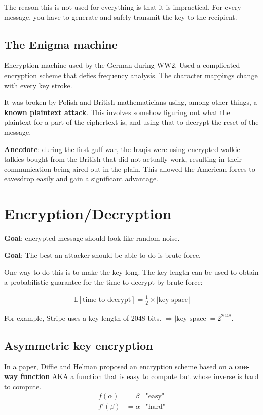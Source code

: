 \documentclass[twoside]{article}
\begin{document}
The reason this is not used for everything is that it is impractical. For every message, you have to generate and safely transmit the key to the recipient.

\subsection{The Enigma machine}
Encryption machine used by the German during WW2. Used a complicated encryption scheme that defies frequency analysis. The character mappings change with every key stroke.

It was broken by Polish and British mathematicians using, among other things, a \textbf{known plaintext attack}. This involves somehow figuring out what the plaintext for a part of the ciphertext is, and using that to decrypt the reset of the message.

\textbf{Anecdote}: during the first gulf war, the Iraqis were using encrypted walkie-talkies bought from the British that did not actually work, resulting in their communication being aired out in the plain. This allowed the American forces to eavesdrop easily and gain a significant advantage.

\section{Encryption/Decryption}
\textbf{Goal}: encrypted message should look like random noise. 

\textbf{Goal}: The best an attacker should be able to do is brute force.

One way to do this is to make the key long. The key length can be used to obtain a probabilistic guarantee for the time to decrypt by brute force:

\begin{align}
    \mathbb{E}[\text{time to decrypt}] = \frac{1}{2} \times |\text{key space}|
\end{align}

For example, Stripe uses a key length of 2048 bits. $\Rightarrow |\text{key space}| = 2^{2048}$.

\subsection{Asymmetric key encryption}
In a paper, Diffie and Helman proposed an encryption scheme based on a \textbf{one-way function} AKA a function that is easy to compute but whose inverse is hard to compute.
    \begin{align}
        f(\alpha) &= \beta & \text{"easy"}\\
        f'(\beta) &= \alpha & \text{"hard"}
    \end{align}
\end{document}
